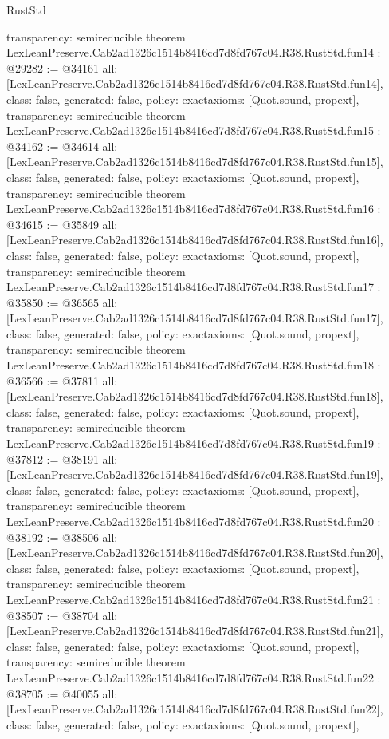 \begin{lexlean}{RustStd}
\begin{coremodule}
{  transparency: semireducible
}
theorem LexLeanPreserve.Cab2ad1326c1514b8416cd7d8fd767c04.R38.RustStd.fun14 : @29282 := @34161 {
  all: [LexLeanPreserve.Cab2ad1326c1514b8416cd7d8fd767c04.R38.RustStd.fun14],
  class: false,
  generated: false,
  policy: exact{axioms: [Quot.sound, propext]},
  transparency: semireducible
}
theorem LexLeanPreserve.Cab2ad1326c1514b8416cd7d8fd767c04.R38.RustStd.fun15 : @34162 := @34614 {
  all: [LexLeanPreserve.Cab2ad1326c1514b8416cd7d8fd767c04.R38.RustStd.fun15],
  class: false,
  generated: false,
  policy: exact{axioms: [Quot.sound, propext]},
  transparency: semireducible
}
theorem LexLeanPreserve.Cab2ad1326c1514b8416cd7d8fd767c04.R38.RustStd.fun16 : @34615 := @35849 {
  all: [LexLeanPreserve.Cab2ad1326c1514b8416cd7d8fd767c04.R38.RustStd.fun16],
  class: false,
  generated: false,
  policy: exact{axioms: [Quot.sound, propext]},
  transparency: semireducible
}
theorem LexLeanPreserve.Cab2ad1326c1514b8416cd7d8fd767c04.R38.RustStd.fun17 : @35850 := @36565 {
  all: [LexLeanPreserve.Cab2ad1326c1514b8416cd7d8fd767c04.R38.RustStd.fun17],
  class: false,
  generated: false,
  policy: exact{axioms: [Quot.sound, propext]},
  transparency: semireducible
}
theorem LexLeanPreserve.Cab2ad1326c1514b8416cd7d8fd767c04.R38.RustStd.fun18 : @36566 := @37811 {
  all: [LexLeanPreserve.Cab2ad1326c1514b8416cd7d8fd767c04.R38.RustStd.fun18],
  class: false,
  generated: false,
  policy: exact{axioms: [Quot.sound, propext]},
  transparency: semireducible
}
theorem LexLeanPreserve.Cab2ad1326c1514b8416cd7d8fd767c04.R38.RustStd.fun19 : @37812 := @38191 {
  all: [LexLeanPreserve.Cab2ad1326c1514b8416cd7d8fd767c04.R38.RustStd.fun19],
  class: false,
  generated: false,
  policy: exact{axioms: [Quot.sound, propext]},
  transparency: semireducible
}
theorem LexLeanPreserve.Cab2ad1326c1514b8416cd7d8fd767c04.R38.RustStd.fun20 : @38192 := @38506 {
  all: [LexLeanPreserve.Cab2ad1326c1514b8416cd7d8fd767c04.R38.RustStd.fun20],
  class: false,
  generated: false,
  policy: exact{axioms: [Quot.sound, propext]},
  transparency: semireducible
}
theorem LexLeanPreserve.Cab2ad1326c1514b8416cd7d8fd767c04.R38.RustStd.fun21 : @38507 := @38704 {
  all: [LexLeanPreserve.Cab2ad1326c1514b8416cd7d8fd767c04.R38.RustStd.fun21],
  class: false,
  generated: false,
  policy: exact{axioms: [Quot.sound, propext]},
  transparency: semireducible
}
theorem LexLeanPreserve.Cab2ad1326c1514b8416cd7d8fd767c04.R38.RustStd.fun22 : @38705 := @40055 {
  all: [LexLeanPreserve.Cab2ad1326c1514b8416cd7d8fd767c04.R38.RustStd.fun22],
  class: false,
  generated: false,
  policy: exact{axioms: [Quot.sound, propext]},
}
\end{coremodule}
\end{lexlean}
